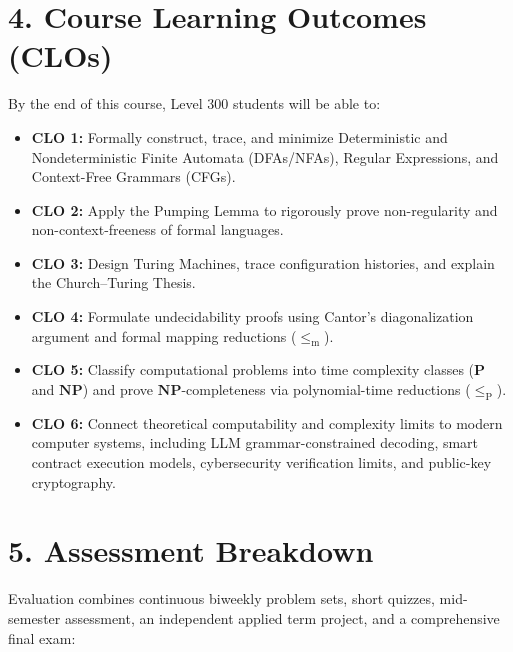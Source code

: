 \documentclass[11pt,a4paper]{article}
\begin{document}
\section*{4. Course Learning Outcomes (CLOs)}
By the end of this course, Level 300 students will be able to:
\begin{itemize}[label=\color{gimpaaccent}$\checkmark$, leftmargin=1.5em, itemsep=2.5pt]
    \item \textbf{CLO 1:} Formally construct, trace, and minimize Deterministic and Nondeterministic Finite Automata (DFAs/NFAs), Regular Expressions, and Context-Free Grammars (CFGs).
    \item \textbf{CLO 2:} Apply the Pumping Lemma to rigorously prove non-regularity and non-context-freeness of formal languages.
    \item \textbf{CLO 3:} Design Turing Machines, trace configuration histories, and explain the Church--Turing Thesis.
    \item \textbf{CLO 4:} Formulate undecidability proofs using Cantor's diagonalization argument and formal mapping reductions ($\le_{\text{m}}$).
    \item \textbf{CLO 5:} Classify computational problems into time complexity classes ($\mathbf{P}$ and $\mathbf{NP}$) and prove $\mathbf{NP}$-completeness via polynomial-time reductions ($\le_{\text{P}}$).
    \item \textbf{CLO 6:} Connect theoretical computability and complexity limits to modern computer systems, including LLM grammar-constrained decoding, smart contract execution models, cybersecurity verification limits, and public-key cryptography.
\end{itemize}

\newpage

\section*{5. Assessment Breakdown}
Evaluation combines continuous biweekly problem sets, short quizzes, mid-semester assessment, an independent applied term project, and a comprehensive final exam:
\end{document}
